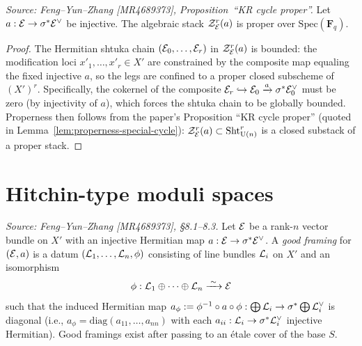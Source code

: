 \begin{theorem}
  \label{thm:properness-shtuka-full}
  \textit{Source: Feng--Yun--Zhang [MR4689373], Proposition~``KR cycle proper''.}
  Let \(a : \mathcal{E} \to \sigma^*\mathcal{E}^\vee\) be injective. The algebraic stack
  \(\mathcal{Z}_{\mathcal{E}}^r(a)\) is proper over \(\mathrm{Spec}(\mathbf{F}_q)\).
\end{theorem}

\begin{proof}
  The Hermitian shtuka chain \((\mathcal{E}_0, \ldots, \mathcal{E}_r)\) in \(\mathcal{Z}_{\mathcal{E}}^r(a)\) is
  bounded: the modification loci \(x'_1, \ldots, x'_r \in X'\) are constrained by
  the composite map equaling the fixed injective \(a\), so the legs are confined to
  a proper closed subscheme of \((X')^r\). Specifically, the cokernel of the composite
  \(\mathcal{E}_r \hookrightarrow \mathcal{E}_0 \xrightarrow{a} \sigma^*\mathcal{E}_0^\vee\) must be
  zero (by injectivity of \(a\)), which forces the shtuka chain to be globally bounded.
  Properness then follows from the paper's Proposition ``KR cycle proper'' (quoted in
  Lemma~\ref{lem:properness-special-cycle}): \(\mathcal{Z}_{\mathcal{E}}^r(a) \subset \operatorname{Sht}_{\operatorname{U}(n)}^r\)
  is a closed substack of a proper stack.
\end{proof}

\section{Hitchin-type moduli spaces}

\begin{definition}
  \label{def:good-framing}
  \textit{Source: Feng--Yun--Zhang [MR4689373], \S8.1--8.3.}
  Let \(\mathcal{E}\) be a rank-\(n\) vector bundle on \(X'\) with an injective Hermitian map
  \(a : \mathcal{E} \to \sigma^*\mathcal{E}^\vee\). A \emph{good framing} for \((\mathcal{E}, a)\) is a
  datum \((\mathcal{L}_1, \ldots, \mathcal{L}_n, \phi)\) consisting of line bundles \(\mathcal{L}_i\) on
  \(X'\) and an isomorphism
  \[
    \phi : \mathcal{L}_1 \oplus \cdots \oplus \mathcal{L}_n \xrightarrow{\;\sim\;} \mathcal{E}
  \]
  such that the induced Hermitian map
  \(a_\phi := \phi^{-1} \circ a \circ \phi : \bigoplus \mathcal{L}_i \to
  \sigma^*\bigoplus \mathcal{L}_i^\vee\)
  is diagonal (i.e., \(a_\phi = \mathrm{diag}(a_{11}, \ldots, a_{nn})\) with each
  \(a_{ii} : \mathcal{L}_i \to \sigma^*\mathcal{L}_i^\vee\) injective Hermitian).
  Good framings exist after passing to an étale cover of the base \(S\).
\end{definition}

